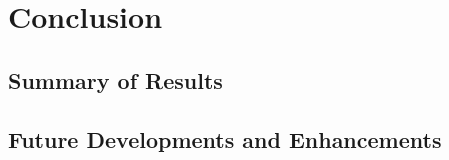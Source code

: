 
\chapter{Conclusion}\label{chapter:conclusion}

\section{Summary of Results}
\section{Future Developments and Enhancements}
